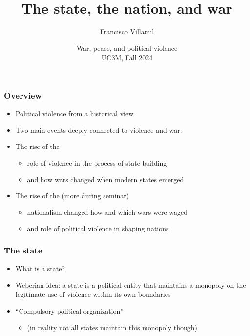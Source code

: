 \documentclass[aspectratio=43]{beamer}
\title{\huge The state, the nation, and war}
\author{Francisco Villamil}
\date{War, peace, and political violence\\UC3M, Fall 2024}
\begin{document}
\begin{frame}
  \titlepage
\end{frame}

\begin{frame}
\frametitle{Overview}
\centering

\begin{itemize}
  \item Political violence from a historical view
  \item Two main events deeply connected to violence and war:
  \item<2->[1.] The rise of the 
  \begin{itemize}
    \item role of violence in the process of state-building
    \item and how wars changed when modern states emerged
  \end{itemize}
  \item<3->[2.] The rise of the  (more during seminar)
  \begin{itemize}
    \item nationalism changed how and which wars were waged
    \item and role of political violence in shaping nations
  \end{itemize}
\end{itemize}

\end{frame}



\begin{frame}
\frametitle{The state}
\centering

\begin{itemize}
\item What is a state?
\item<2-> Weberian idea: a state is a political entity that maintains a monopoly on the legitimate use of violence within its own boundaries
\item<2-> ``Compulsory political organization''
\begin{itemize}
  \item<2-> (in reality not all states maintain this monopoly though)
\end{itemize}

\end{itemize}

\end{frame}
\end{document}
